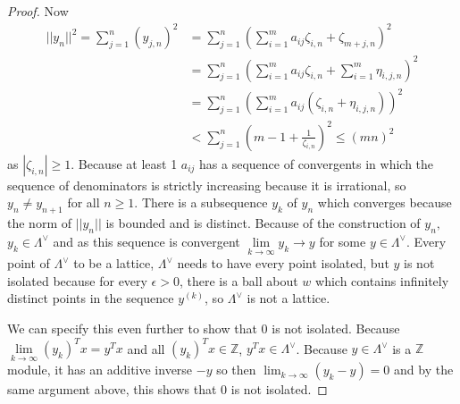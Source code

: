 \documentclass{article}
\renewcommand{\leq}{\leqslant}
\renewcommand{\geq}{\geqslant}
\newcommand{\Z}[0]{\mathbb{Z}}		%
\newcommand{\R}[0]{\mathbb{R}}		%
\theoremstyle{definition}
\theoremstyle{remark}
\begin{document}
\begin{proof}
Now \begin{align}
    ||y_n||^2 = \sum_{j=1}^n (y_{j,n})^2  &= \sum_{j=1}^n\left(\sum_{i=1}^m a_{ij} \zeta_{i,n} + \zeta_{m+j,n}\right)^2\\
    &=\sum_{j=1}^n\left(\sum_{i=1}^m a_{ij} \zeta_{i,n} +  \sum\limits_{i=1}^m \eta_{i,j,n}\right)^2\\
    &=\sum_{j=1}^n\left(\sum_{i=1}^m a_{ij}\left( \zeta_{i,n} +  \eta_{i,j,n}\right)\right)^2\\
    &< \sum_{j=1}^n\left(m-1 +\frac{1}{\zeta_{i,n}}\right)^2 \leq (mn)^2
\end{align}
as $|\zeta_{i,n}|\geq 1$. 
Because  at least 1 $a_{ij}$ has a sequence of convergents in which the sequence of denominators is strictly increasing because it is irrational, so $y_n\neq y_{n+1}$ for all $n\geq 1$.  There is a subsequence $y_k$ of $y_n$ which converges because the norm of $||y_n||$ is bounded and is distinct. Because of the construction of $y_n,$ $y_{k}\in \Lambda^\vee$ and as this sequence is convergent $\lim\limits_{k\to\infty} y_k \to y$ for some $y\in \Lambda^\vee$. Every point of  $\Lambda^\vee$ to be a lattice, $\Lambda^\vee$ needs to have every point isolated, but $y$ is not isolated because for every $\epsilon>0$, there is a ball about $w$ which contains infinitely distinct points in the sequence $y^{(k)}$, so $\Lambda^\vee$ is not a lattice. 

We can specify this even further to show that $0$ is not isolated. Because $\lim\limits_{k\to \infty} (y_k)^T x= y^Tx$ and all $(y_k)^T x  \in \Z$, $y^Tx\in \Lambda^\vee$. Because $y\in \Lambda^\vee$ is a $\Z$ module, it has an additive inverse $-y$ so then $\lim_{k\to \infty}(y_k-y)= 0$ and by the same argument above, this shows that $0$ is not isolated. 


\end{proof}
\end{document}
